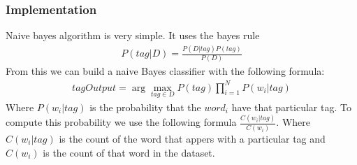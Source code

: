 \documentclass[a4paper,8pt,oneside]{article}
\begin{document}
		\subsubsection{Implementation}
			Naive bayes algorithm is very simple. It uses the bayes rule
			\begin{gather*}
				P(tag|D) = \frac{P(D|tag)P(tag)}{P(D)}
			\end{gather*}
			From this we can build a naive Bayes classifier with the following formula:
			\begin{gather*}
				tagOutput = \arg\max_{tag \in D} P(tag) \prod_{i=1}^N P(w_i | tag)
			\end{gather*}
			Where $P(w_i | tag)$ is the probability that the $word_i$ have that particular tag. To compute this probability we use the following formula $\frac{C(w_i | tag)}{C(w_i)}$. Where $C(w_i | tag)$ is the count of the word that appers with a particular tag and $C(w_i)$ is the count of that word in the dataset.
\end{document}
